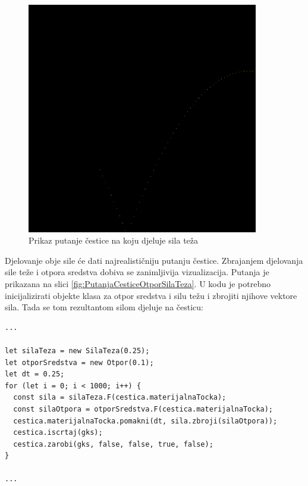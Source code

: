 \documentclass{foi}
\begin{document}
\begin{figure}[H]
    \centering
    \includegraphics[width=0.9\textwidth]{slike/12_PutanjaCesticeSilaTeza.png}
    \captionsetup{justification=centering}
    \caption{Prikaz putanje čestice na koju djeluje sila teža}
\label{fig:PutanjaCesticeSilaTeza}
\end{figure}
Djelovanje obje sile će dati najrealističniju putanju čestice. Zbrajanjem djelovanja sile teže i otpora sredstva dobiva se zanimljivija vizualizacija. Putanja je prikazana na slici \ref{fig:PutanjaCesticeOtporSilaTeza}. U kodu je potrebno inicijalizirati objekte klasa za otpor sredstva i silu težu i zbrojiti njihove vektore sila. Tada se tom rezultantom silom djeluje na česticu:

\begin{verbatim}
...

let silaTeza = new SilaTeza(0.25);
let otporSredstva = new Otpor(0.1);
let dt = 0.25;
for (let i = 0; i < 1000; i++) {
  const sila = silaTeza.F(cestica.materijalnaTocka);
  const silaOtpora = otporSredstva.F(cestica.materijalnaTocka);
  cestica.materijalnaTocka.pomakni(dt, sila.zbroji(silaOtpora));
  cestica.iscrtaj(gks);
  cestica.zarobi(gks, false, false, true, false);
}

...
\end{verbatim}
\end{document}
